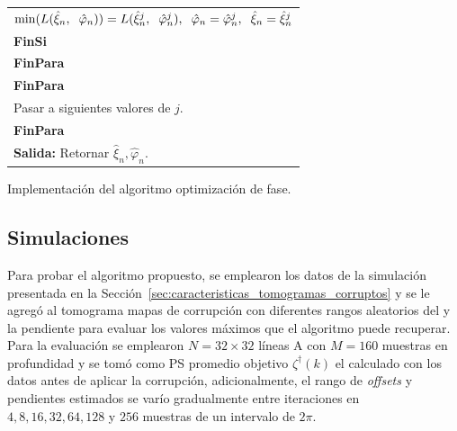 \begin{algorithm}
\begin{tabularx}{0.8\textwidth}{l}
		\hspace*{1.8cm} $\min(L(\hat{\xi}_n,\hspace*{0.2cm} \hat{\varphi}_n))=L(\hat{\xi}^j_n,\hspace*{0.2cm}\hat{\varphi}^j_n),\hspace*{0.2cm} \hat{\varphi}_n=\hat{\varphi}^j_n,\hspace*{0.2cm} \hat{\xi}_n=\hat{\xi}^j_n$\\
		\hspace*{1.5cm} \textbf{FinSi}\\
		\hspace*{1.2cm} \textbf{FinPara}\\
		\hspace*{0.9cm} \textbf{FinPara}\\
		\hspace*{0.9cm} Pasar a siguientes valores de $j$.\\
		\hspace*{0.6cm}\textbf{FinPara}\\
		\hspace*{0.6cm}\textbf{Salida:} Retornar $\hat{\xi}_n, \hat{\varphi}_n$.\\
		
	\end{tabularx}
	\caption{Implementación del algoritmo optimización de fase.}
	\label{alg:optalgo}
\end{algorithm}

\subsection{Simulaciones}

Para probar el algoritmo propuesto, se emplearon los datos de la simulación presentada en la Sección~\ref{sec:caracteristicas_tomogramas_corruptos} y se le agregó al tomograma mapas de corrupción con diferentes rangos aleatorios del \offset y la pendiente para evaluar los valores máximos que el algoritmo puede recuperar. Para la evaluación se emplearon $N = 32\times32$ líneas A con $M = 160$ muestras en profundidad y se tomó como PS promedio objetivo $\zeta^{\dagger}(k)$ el calculado con los datos antes de aplicar la corrupción, adicionalmente, el rango de \textit{offsets} y pendientes estimados se varío gradualmente entre iteraciones en $4, 8, 16, 32, 64, 128$ y $256$ muestras de un intervalo de $2\pi$.

